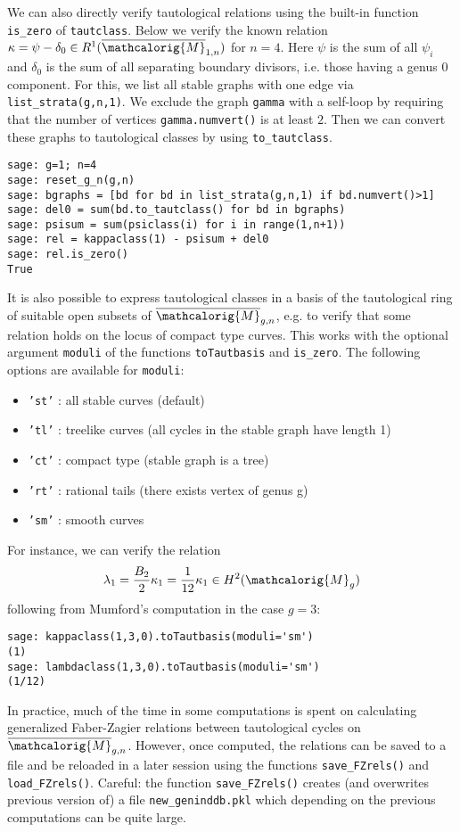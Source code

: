 \documentclass[11pt]{article}
\newcommand{\M}{\ensuremath{\overline{\mathcalorig{M}}}}
\begin{document}
We can also directly verify tautological relations using the built-in function \verb|is_zero| of \verb|tautclass|. Below we verify the known relation $\kappa = \psi - \delta_0 \in R^1(\M_{1,n})$ for $n=4$. Here $\psi$ is the sum of all $\psi_i$ and $\delta_0$ is the sum of all separating boundary divisors, i.e. those having a genus $0$ component. For this, we list all stable graphs with one edge via \verb|list_strata(g,n,1)|. We exclude the graph \verb|gamma| with a self-loop by requiring that the number of vertices \verb|gamma.numvert()| is at least $2$. Then we can convert these graphs to tautological classes by using \verb|to_tautclass|.
\begin{lstlisting}
sage: g=1; n=4
sage: reset_g_n(g,n)
sage: bgraphs = [bd for bd in list_strata(g,n,1) if bd.numvert()>1]
sage: del0 = sum(bd.to_tautclass() for bd in bgraphs)
sage: psisum = sum(psiclass(i) for i in range(1,n+1))
sage: rel = kappaclass(1) - psisum + del0
sage: rel.is_zero()
True
\end{lstlisting}
It is also possible to express tautological classes in a basis of the tautological ring of suitable open subsets of $\M_{g,n}$, e.g. to verify that some relation holds on the locus of compact type curves. This works with the optional argument \texttt{moduli}
of the functions \texttt{toTautbasis} and \verb|is_zero|. The following options are available for \texttt{moduli}:
\begin{itemize}
    \item \texttt{'st'} : all stable curves (default)
    \item \texttt{'tl'} : treelike curves (all cycles in the stable graph have length 1)
    \item \texttt{'ct'} : compact type (stable graph is a tree)
    \item \texttt{'rt'} : rational tails (there exists vertex of genus g)
    \item \texttt{'sm'} : smooth curves
\end{itemize}
For instance, we can verify the relation \[\lambda_1 = \frac{B_2}{2} \kappa_1 = \frac{1}{12} \kappa_1 \in H^2(\mathcalorig{M}_g)\] following from Mumford's computation \cite{mumfordtowards} in the case $g=3$:
\begin{lstlisting}
sage: kappaclass(1,3,0).toTautbasis(moduli='sm')
(1)
sage: lambdaclass(1,3,0).toTautbasis(moduli='sm')
(1/12)
\end{lstlisting}
In practice, much of the time in some computations is spent on calculating generalized Faber-Zagier relations between tautological cycles on $\M_{g,n}$. However, once computed, the relations can be saved to a file and be reloaded in a later session using the functions \verb|save_FZrels()| and \verb|load_FZrels()|. Careful: the function \verb|save_FZrels()| creates (and overwrites previous version of) a file \verb|new_geninddb.pkl| which depending on the previous computations can be quite large.
\end{document}
